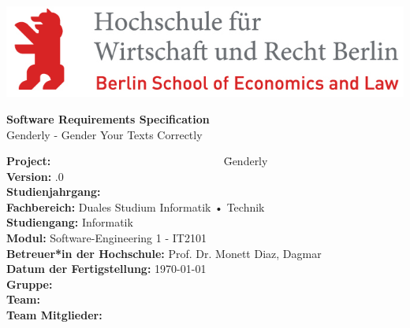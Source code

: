 \hfill
\includegraphics[scale=1]
{Bilder/Logos/HWR_Logo_farbig.jpg}

\begin{center}
	\vspace{1cm}
	\Huge{\textbf{Software Requirements Specification}}\\
	\vspace{1cm}
	\Large{Genderly - Gender Your Texts Correctly}\\
	\vspace{1cm}
\end{center}{\huge \par}

\begin{doublespacing}
	\begin{large}
		\begin{tabbing}
			
			\textbf{Project:} ~~~~~~~~~~~~~~~~~~~~~~~~~~~~~~ \= Genderly \\
			\textbf{Version:} .0 \\
			\textbf{Studienjahrgang:} \\
			\textbf{Fachbereich:} \> Duales Studium Informatik • Technik \\
			\textbf{Studiengang:} \> Informatik \\
			\textbf{Modul:}	 \> Software-Engineering 1 - IT2101\\
			\textbf{Betreuer*in der Hochschule:} \> Prof. Dr. Monett Diaz, Dagmar \\
			\textbf{Datum der Fertigstellung:} \> \today \\
			\textbf{Gruppe:} \\
			\textbf{Team:} \\
			\textbf{Team Mitglieder:} \>  \\
			
		\end{tabbing}
	\end{large}
\end{doublespacing}


